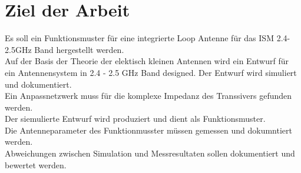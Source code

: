 \section{Ziel der Arbeit}
Es soll ein Funktionsmuster für eine integrierte Loop Antenne für das ISM  2.4-2.5GHz Band hergestellt werden.\\

Auf der Basis der Theorie der elektisch kleinen Antennen wird ein Entwurf für ein Antennensystem in 2.4 - 2.5 GHz Band designed. Der Entwurf wird simuliert und dokumentiert. \\
Ein Anpassnetzwerk muss für die komplexe Impedanz des Transsivers gefunden werden.\\
Der siemulierte Entwurf wird produziert und dient als Funktionsmuster. \\
Die Antenneparameter des Funktionmusster müssen gemessen und dokumntiert werden.\\ Abweichungen zwischen Simulation und Messresultaten sollen dokumentiert und bewertet werden.


